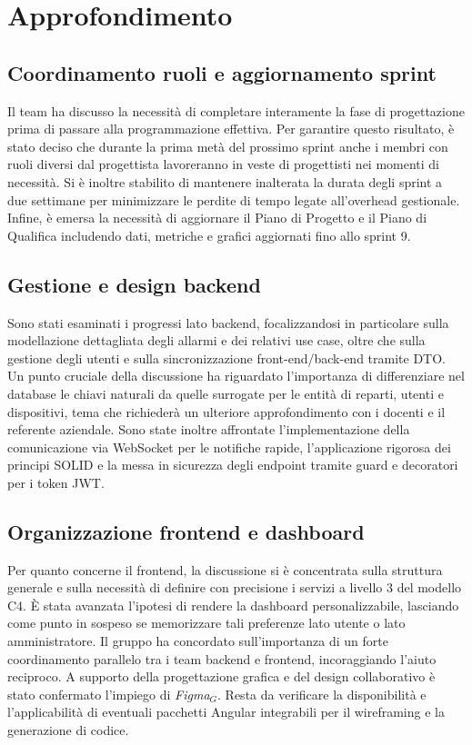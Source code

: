 \documentclass[10pt, letterpaper]{article}
\begin{document}
\section{Approfondimento}

\subsection*{Coordinamento ruoli e aggiornamento sprint}
Il team ha discusso la necessità di completare interamente la fase di progettazione prima di passare alla programmazione effettiva. Per garantire questo risultato, è stato deciso che durante la prima metà del prossimo sprint anche i membri con ruoli diversi dal progettista lavoreranno in veste di progettisti nei momenti di necessità.
Si è inoltre stabilito di mantenere inalterata la durata degli sprint a due settimane per minimizzare le perdite di tempo legate all'overhead gestionale.
Infine, è emersa la necessità di aggiornare il Piano di Progetto e il Piano di Qualifica includendo dati, metriche e grafici aggiornati fino allo sprint 9.

\subsection*{Gestione e design backend}
Sono stati esaminati i progressi lato backend, focalizzandosi in particolare sulla modellazione dettagliata
degli allarmi e dei relativi use case, oltre che sulla gestione degli utenti e sulla sincronizzazione front-end/back-end tramite DTO.
Un punto cruciale della discussione ha riguardato l'importanza di differenziare nel database le chiavi naturali da quelle surrogate per le entità di reparti,
utenti e dispositivi, tema che richiederà un ulteriore approfondimento con i docenti e il referente aziendale.
Sono state inoltre affrontate l'implementazione della comunicazione via WebSocket per le notifiche rapide, l'applicazione rigorosa dei principi SOLID e la messa in sicurezza degli endpoint tramite guard e decoratori per i token JWT.

\subsection*{Organizzazione frontend e dashboard}
Per quanto concerne il frontend, la discussione si è concentrata sulla struttura generale e sulla necessità
di definire con precisione i servizi a livello 3 del modello C4.
È stata avanzata l'ipotesi di rendere la dashboard personalizzabile, lasciando come punto in sospeso se memorizzare tali preferenze lato utente o lato amministratore.
Il gruppo ha concordato sull'importanza di un forte coordinamento parallelo tra i team backend e frontend, incoraggiando l'aiuto reciproco.
A supporto della progettazione grafica e del design collaborativo è stato confermato l'impiego di \textit{Figma$_G$}.
Resta da verificare la disponibilità e l'applicabilità di eventuali pacchetti Angular integrabili per il wireframing e la generazione di codice.
\end{document}
